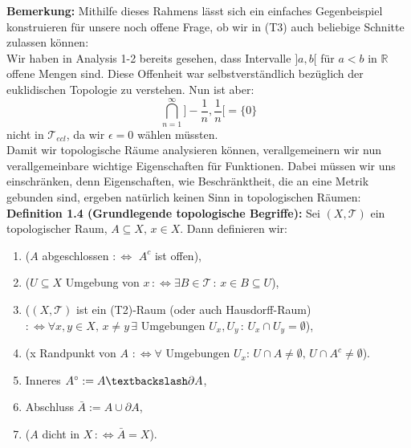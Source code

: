 \documentclass[11pt,english]{smfart}
\begin{document}
\textbf{Bemerkung:} Mithilfe dieses Rahmens lässt sich ein einfaches Gegenbeispiel konstruieren für unsere noch offene Frage, ob wir in (T3) auch beliebige Schnitte zulassen können:\\
Wir haben in Analysis 1-2 bereits gesehen, dass Intervalle \(]a,b[\) für \(a < b\) in \(\mathbb{R}\) offene Mengen sind. Diese Offenheit war selbstverständlich bezüglich der euklidischen Topologie zu verstehen. Nun ist aber:
\begin{equation}
    \bigcap_{n=1}^{\infty} ]-\frac{1}{n},\frac{1}{n}[ = \{0\}
\end{equation}
nicht in \(\mathcal{T}_{ecl}\), da wir \(\epsilon = 0\) wählen müssten.\\

Damit wir topologische Räume analysieren können, verallgemeinern wir nun verallgemeinbare wichtige Eigenschaften für Funktionen. Dabei müssen wir uns einschränken, denn Eigenschaften, wie Beschränktheit, die an eine Metrik gebunden sind, ergeben natürlich keinen Sinn in topologischen Räumen:\\[0.5cm]
\textbf{Definition 1.4 (Grundlegende topologische Begriffe):} Sei \((X,\mathcal{T})\) ein topologischer Raum, \(A \subseteq X, \, x \in X\). Dann definieren wir:
\begin{enumerate}
    \item (\(A\) abgeschlossen \(:\Leftrightarrow\) \(A^c\) ist offen),
    \item (\(U \subseteq X\) Umgebung von \(x \, :\Leftrightarrow \exists B \in \mathcal{T} \, : \, x \in B \subseteq U\)),
    \item (\((X,\mathcal{T})\) ist ein (T2)-Raum (oder auch Hausdorff-Raum) \(:\Leftrightarrow \forall x,y \in X, \, x \neq y \, \exists \text{ Umgebungen }U_x,U_y \, : \, U_x \cap U_y = \emptyset\)),
    \item (x Randpunkt von \(A\) \(:\Leftrightarrow \forall \text{ Umgebungen }U_x: \, U \cap A \neq \emptyset, \, U \cap A^c \neq \emptyset\)).
    \item Inneres \(A^{\circ} := A \textbackslash \partial A\),
    \item Abschluss \(\bar{A} := A \cup \partial A\),
    \item (\(A\) dicht in \(X \, :\Leftrightarrow \bar{A} = X\)).
\end{enumerate}
\end{document}
